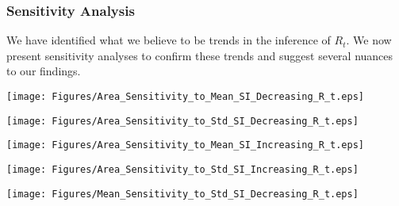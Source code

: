 \documentclass[10pt,journal,compsoc]{IEEEtran}
\begin{document}


\subsubsection{Sensitivity Analysis}\label{sect::Sens_Linear_R}

We have identified what we believe to be trends in the inference of $R_t$. We now present sensitivity analyses to confirm these trends and suggest several nuances to our findings.

\begin{minipage}{\linewidth}
\centering
\texttt{[image: Figures/Area\_Sensitivity\_to\_Mean\_SI\_Decreasing\_R\_t.eps]}
\label{fig:Vary_Lin_Increase_R_Disc_Serial_4}
\end{minipage}

\begin{minipage}{\linewidth}
\centering
\texttt{[image: Figures/Area\_Sensitivity\_to\_Std\_SI\_Decreasing\_R\_t.eps]}
\label{fig:Vary_Lin_Increase_R_Disc_Serial_4}
\end{minipage}

\begin{minipage}{\linewidth}
\centering
\texttt{[image: Figures/Area\_Sensitivity\_to\_Mean\_SI\_Increasing\_R\_t.eps]}
\label{fig:Vary_Lin_Increase_R_Disc_Serial_4}
\end{minipage}

\begin{minipage}{\linewidth}
\centering
\texttt{[image: Figures/Area\_Sensitivity\_to\_Std\_SI\_Increasing\_R\_t.eps]}
\label{fig:Vary_Lin_Increase_R_Disc_Serial_4}
\end{minipage}

\begin{minipage}{\linewidth}
\centering
\texttt{[image: Figures/Mean\_Sensitivity\_to\_Std\_SI\_Decreasing\_R\_t.eps]}
\label{fig:Vary_Lin_Increase_R_Disc_Serial_4}
\end{minipage}
\end{document}
